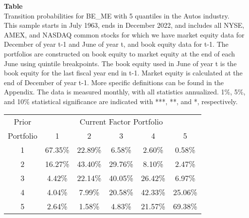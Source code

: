 \begin{table*}[ht!]
\raggedright
{}
\label{tab: transition_probs_BE_ME_Autos_with_5_quantiles}
\textbf{Table \thetable} \\
Transition probabilities for BE_ME with 5 quantiles in the Autos industry. \\
\hspace*{1em}This sample starts in July 1963, ends in December 2022, and includes all NYSE, AMEX, and NASDAQ common stocks for which we have market equity data for December of year t-1 and June of year t, and book equity data for t-1. The portfolios are constructed on book equity to market equity at the end of each June using quintile breakpoints.  The book equity used in June of year t is the book equity for the last fiscal year end in t-1.  Market equity is calculated at the end of December of year t-1.  More specific definitions can be found in the Appendix.  The data is measured monthly, with all statistics annualized.  1\%, 5\%, and 10\% statistical significance are indicated with ***, **, and *, respectively. \\
\vspace{0.5em}
\centering
\begin{adjustbox}{max width=\textwidth}
\begin{tabular}{@{}cccccc@{}}
\toprule
Prior & \multicolumn{5}{c}{Current Factor Portfolio} \\
Portfolio & 1 & 2 & 3 & 4 & 5 \\
\midrule
1 & 67.35\% & 22.89\% & 6.58\% & 2.60\% & 0.58\% \\
2 & 16.27\% & 43.40\% & 29.76\% & 8.10\% & 2.47\% \\
3 & 4.42\% & 22.14\% & 40.05\% & 26.42\% & 6.97\% \\
4 & 4.04\% & 7.99\% & 20.58\% & 42.33\% & 25.06\% \\
5 & 2.64\% & 1.58\% & 4.83\% & 21.57\% & 69.38\% \\
\bottomrule
\end{tabular}
\end{adjustbox}
\end{table*}